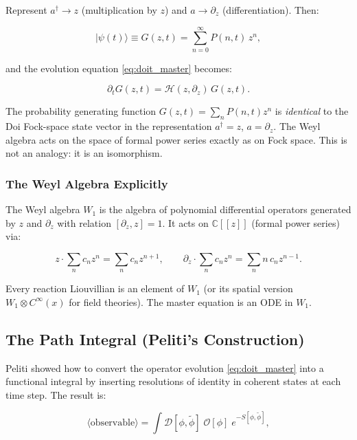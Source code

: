 \documentclass[11pt,a4paper]{article}
\theoremstyle{definition}
\newcommand{\C}{\mathbb{C}}
\newcommand{\ad}{a^\dagger}
\newcommand{\Hcal}{\mathcal{H}}
\begin{document}
Represent $\ad \to z$ (multiplication by $z$) and $a \to \partial_z$ (differentiation).
Then:

\begin{equation}
  |\psi(t)\rangle \equiv G(z,t) = \sum_{n=0}^\infty P(n,t)\,z^n,
  \label{eq:dp_gf}
\end{equation}

and the evolution equation \eqref{eq:doit_master} becomes:

\begin{equation}
  \partial_t G(z,t) = \Hcal(z, \partial_z)\, G(z,t).
  \label{eq:dp_gfeq}
\end{equation}

\begin{keybox}
The probability generating function $G(z,t) = \sum_n P(n,t)z^n$ is \emph{identical}
to the Doi Fock-space state vector in the representation $\ad = z$, $a = \partial_z$.
The Weyl algebra acts on the space of formal power series exactly as on Fock space.
This is not an analogy: it is an isomorphism.
\end{keybox}

\subsubsection{The Weyl Algebra Explicitly}

The Weyl algebra $W_1$ is the algebra of polynomial differential operators generated
by $z$ and $\partial_z$ with relation $[\partial_z, z] = 1$. It acts on $\C[[z]]$
(formal power series) via:

\[
  z \cdot \sum_n c_n z^n = \sum_n c_n z^{n+1}, \qquad
  \partial_z \cdot \sum_n c_n z^n = \sum_n n\,c_n z^{n-1}.
\]

Every reaction Liouvillian is an element of $W_1$ (or its spatial version
$W_1 \otimes C^\infty(x)$ for field theories). The master equation is an
ODE in $W_1$.

\subsection{The Path Integral (Peliti's Construction)}

Peliti \cite{peliti1985} showed how to convert the operator evolution
\eqref{eq:doit_master} into a functional integral by inserting resolutions of
identity in coherent states at each time step. The result is:

\begin{equation}
  \langle \text{observable} \rangle =
  \int \mathcal{D}[\phi, \tilde\phi]\; \mathcal{O}[\phi]\; e^{-S[\phi,\tilde\phi]},
  \label{eq:path_integral}
\end{equation}
\end{document}
